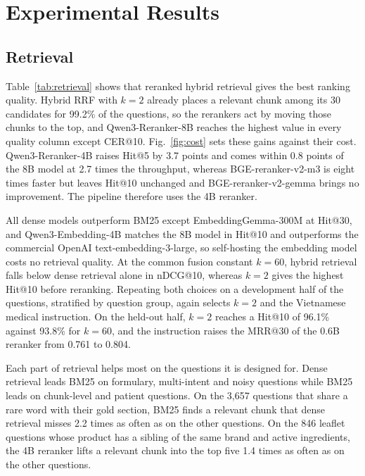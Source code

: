 \section{Experimental Results}\label{sec:results}
\suppressfloats[t]

\subsection{Retrieval}\label{sec:results-retrieval}




Table~\ref{tab:retrieval} shows that reranked hybrid retrieval gives the best ranking quality. Hybrid RRF with $k=2$ already places a relevant chunk among its 30 candidates for 99.2\% of the questions, so the rerankers act by moving those chunks to the top, and Qwen3-Reranker-8B reaches the highest value in every quality column except CER@10. Fig.~\ref{fig:cost} sets these gains against their cost. Qwen3-Reranker-4B raises Hit@5 by 3.7 points and comes within 0.8 points of the 8B model at 2.7 times the throughput, whereas BGE-reranker-v2-m3 is eight times faster but leaves Hit@10 unchanged and BGE-reranker-v2-gemma brings no improvement. The pipeline therefore uses the 4B reranker.

All dense models outperform BM25 except EmbeddingGemma-300M at Hit@30, and Qwen3-Embedding-4B matches the 8B model in Hit@10 and outperforms the commercial OpenAI text-embedding-3-large, so self-hosting the embedding model costs no retrieval quality. At the common fusion constant $k=60$, hybrid retrieval falls below dense retrieval alone in nDCG@10, whereas $k=2$ gives the highest Hit@10 before reranking. Repeating both choices on a development half of the questions, stratified by question group, again selects $k=2$ and the Vietnamese medical instruction. On the held-out half, $k=2$ reaches a Hit@10 of 96.1\% against 93.8\% for $k=60$, and the instruction raises the MRR@30 of the 0.6B reranker from 0.761 to 0.804.

Each part of retrieval helps most on the questions it is designed for. Dense retrieval leads BM25 on formulary, multi-intent and noisy questions while BM25 leads on chunk-level and patient questions. On the 3{,}657 questions that share a rare word with their gold section, BM25 finds a relevant chunk that dense retrieval misses 2.2 times as often as on the other questions. On the 846 leaflet questions whose product has a sibling of the same brand and active ingredients, the 4B reranker lifts a relevant chunk into the top five 1.4 times as often as on the other questions.

